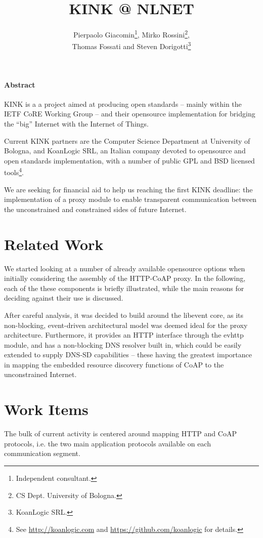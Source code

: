 \documentclass[12pt]{article}
\title{KINK @ NLNET}
\author{Pierpaolo Giacomin\footnote{Independent consultant.}, Mirko Rossini\footnote{CS Dept. University of Bologna.},\\Thomas Fossati and Steven Dorigotti\footnote{KoanLogic SRL.}}
\begin{document}
\maketitle
\tableofcontents

\paragraph{Abstract}
KINK is a a project aimed at producing open standards -- mainly within the IETF CoRE Working Group -- and their \mbox{opensource} implementation for bridging the ``big'' Internet with the Internet of Things.

Current KINK partners are the Computer Science Department at University of Bologna, and KoanLogic SRL, an Italian company devoted to \mbox{opensource} and open standards implementation, with a number of public GPL and BSD licensed tools\footnote{See \href{http://koanlogic.com}{http://koanlogic.com} and \href{https://github.com/koanlogic}{https://github.com/koanlogic} for details.}.

We are seeking for financial aid to help us reaching the first KINK deadline: the implementation of a proxy module to enable transparent communication between the unconstrained and constrained sides of future Internet.

\section{Related Work}
We started looking at a number of already available opensource options when initially considering the assembly of the HTTP-CoAP proxy.  In the following, each of the these components is briefly illustrated, while the main reasons for deciding against their use is discussed.

After careful analysis, it was decided to build around the libevent core, as its non-blocking, event-driven architectural model was deemed ideal for the proxy architecture.  Furthermore, it provides an HTTP interface through the evhttp module, and has a non-blocking DNS resolver built in, which could be easily extended to supply DNS-SD capabilities -- these having the greatest importance in mapping the embedded resource discovery functions of CoAP to the unconstrained Internet.



\section{Work Items}
The bulk of current activity is centered around mapping HTTP and CoAP protocols, i.e. the two main application protocols available on each communication segment.
\end{document}
